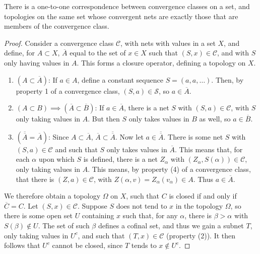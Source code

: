 \begin{theorem}
    There is a one-to-one correspondence between convergence classes on a set, and topologies on the same set whose convergent nets are exactly those that are members of the convergence class.
\end{theorem}
\begin{proof}
    Consider a convergence class $\mathcal{C}$, with nets with values in a set $X$, and define, for $A \subset X$, $\overline{A}$ equal to the set of $x \in X$ such that $(S,x) \in \mathcal{C}$, and with $S$ only having values in $A$. This forms a closure operator, defining a topology on $X$.
    \begin{enumerate}
        \item $(A \subset \overline{A})$: If $a \in A$, define a constant sequence $S = (a,a,\dots)$. Then, by property 1 of a convergence class, $(S,a) \in \mathcal{S}$, so $a \in \overline{A}$.
        \item $(A \subset B) \implies (\overline{A} \subset \overline{B})$: If $a \in \overline{A}$, there is a net $S$ with $(S,a) \in \mathcal{C}$, with $S$ only taking values in $A$. But then $S$ only takes values in $B$ as well, so $a \in \overline{B}$.
        \item $(\overline{\overline{A}} = \overline{A})$: Since $A \subset \overline{A}$, $\overline{A} \subset \overline{\overline{A}}$. Now let $a \in \overline{\overline{A}}$. There is some net $S$ with $(S,a) \in \mathcal{C}$ and such that $S$ only takes values in $\overline{A}$. This means that, for each $\alpha$ upon which $S$ is defined, there is a net $Z_\alpha$ with $(Z_\alpha, S(\alpha)) \in \mathcal{C}$, only taking values in $A$. This means, by property (4) of a convergence class, that there is $(Z,a) \in \mathcal{C}$, with $Z(\alpha, v) = Z_\alpha(v_\alpha) \in A$. Thus $a \in \overline{A}$.
    \end{enumerate}

    We therefore obtain a topology $\Omega$ on $X$, such that $C$ is closed if and only if $\overline{C} = C$. Let $(S,x) \in \mathcal{C}$. Suppose $S$ does not tend to $x$ in the topology $\Omega$, so there is some open set $U$ containing $x$ such that, for any $\alpha$, there is $\beta > \alpha$ with $S(\beta) \not \in U$. The set of such $\beta$ defines a cofinal set, and thus we gain a subnet $T$, only taking values in $U^c$, and such that $(T,x) \in \mathcal{C}$ (property (2)). It then follows that $U^c$ cannot be closed, since $T$ tends to $x \not \in U^c$.


\end{proof}
